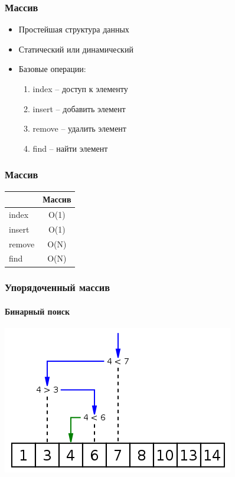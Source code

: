 \documentclass[12pt,pdf,hyperref={unicode}]{beamer}
\begin{document}
\begin{frame}[fragile]
\frametitle{Массив}
\begin{itemize}
\item Простейшая структура данных \\
\item Статический или динамический \\
\item Базовые операции:
\begin{enumerate}
\item index  --  доступ к элементу
\item insert --  добавить элемент
\item remove --  удалить элемент
\item find   --  найти элемент
\end{enumerate}
\end{itemize}
\end{frame}


\begin{frame}[fragile]
\frametitle{Массив}
\begin{center}
  \begin{tabular}{  l | c }
      & Массив \\
    \hline
    index & O(1) \\
    insert & O(1)  \\
    remove & O(N) \\
    find & O(N)  \\
    \hline
  \end{tabular}
\end{center}
\end{frame}


\begin{frame}[fragile]
\frametitle{Упорядоченный массив}
\framesubtitle{Бинарный поиск} 
\begin{center}
\includegraphics[width=0.7\linewidth]{images/Binary_search_into_array.png}
\end{center}
\end{frame}
\end{document}
